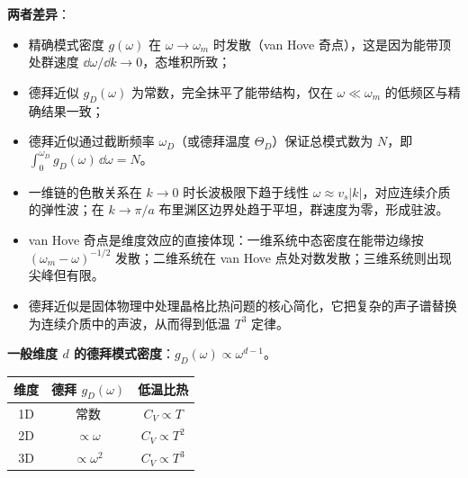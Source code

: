 \begin{derivationbox}[标准解题过程]
\textbf{两者差异}：
\begin{itemize}
    \item 精确模式密度 $g(\omega)$ 在 $\omega\to\omega_m$ 时发散（van Hove 奇点），这是因为能带顶处群速度 $\dd\omega/\dd k\to0$，态堆积所致；
    \item 德拜近似 $g_D(\omega)$ 为常数，完全抹平了能带结构，仅在 $\omega\ll\omega_m$ 的低频区与精确结果一致；
    \item 德拜近似通过截断频率 $\omega_D$（或德拜温度 $\Theta_D$）保证总模式数为 $N$，即 $\int_0^{\omega_D}g_D(\omega)\,\dd\omega=N$。
\end{itemize}
\end{derivationbox}

\begin{insightbox}[物理图像]
\begin{itemize}
    \item 一维链的色散关系在 $k\to0$ 时长波极限下趋于线性 $\omega\approx v_s|k|$，对应连续介质的弹性波；在 $k\to\pi/a$ 布里渊区边界处趋于平坦，群速度为零，形成驻波。
    \item van Hove 奇点是维度效应的直接体现：一维系统中态密度在能带边缘按 $(\omega_m-\omega)^{-1/2}$ 发散；二维系统在 van Hove 点处对数发散；三维系统则出现尖峰但有限。
    \item 德拜近似是固体物理中处理晶格比热问题的核心简化，它把复杂的声子谱替换为连续介质中的声波，从而得到低温 $T^3$ 定律。
\end{itemize}
\end{insightbox}

\begin{formulabox}[推广速查]
\textbf{一般维度 $d$ 的德拜模式密度}：$g_D(\omega)\propto\omega^{d-1}$。
\begin{center}
\begin{tabular}{ccc}
\toprule
\textbf{维度} & \textbf{德拜 $g_D(\omega)$} & \textbf{低温比热} \\
\midrule
1D & 常数 & $C_V\propto T$ \\
2D & $\propto\omega$ & $C_V\propto T^2$ \\
3D & $\propto\omega^2$ & $C_V\propto T^3$ \\
\bottomrule
\end{tabular}
\end{center}
\end{formulabox}
